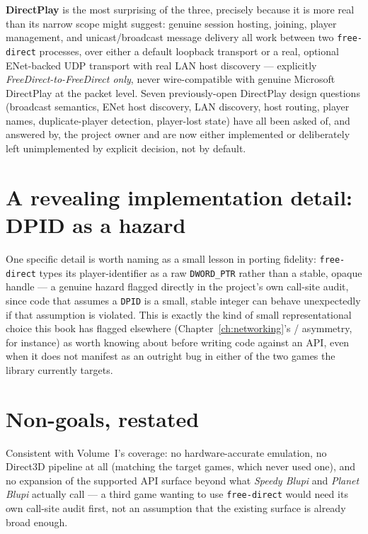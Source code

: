 \textbf{DirectPlay} is the most surprising of the three, precisely because it is more real
than its narrow scope might suggest: genuine session hosting, joining, player management, and
unicast/broadcast message delivery all work between two \texttt{free-direct} processes, over
either a default loopback transport or a real, optional ENet-backed UDP transport with real
LAN host discovery --- explicitly \emph{FreeDirect-to-FreeDirect only}, never wire-compatible
with genuine Microsoft DirectPlay at the packet level. Seven previously-open DirectPlay design
questions (broadcast semantics, ENet host discovery, LAN discovery, host routing, player
names, duplicate-player detection, player-lost state) have all been asked of, and answered by,
the project owner and are now either implemented or deliberately left unimplemented by
explicit decision, not by default.

\section{A revealing implementation detail: DPID as a hazard}

One specific detail is worth naming as a small lesson in porting fidelity: \texttt{free-direct}
types its  player-identifier as a raw \texttt{DWORD\_PTR} rather than a stable,
opaque handle --- a genuine hazard flagged directly in the project's own call-site audit,
since code that assumes a \texttt{DPID} is a small, stable integer can behave unexpectedly if
that assumption is violated. This is exactly the kind of small representational choice this
book has flagged elsewhere (Chapter~\ref{ch:networking}'s /%
  asymmetry, for instance) as worth knowing about
before writing code against an API, even when it does not manifest as an outright bug in
either of the two games the library currently targets.

\section{Non-goals, restated}

Consistent with Volume~I's coverage: no hardware-accurate emulation, no Direct3D pipeline at
all (matching the target games, which never used one), and no expansion of the supported API
surface beyond what \emph{Speedy Blupi} and \emph{Planet Blupi} actually call --- a third
game wanting to use \texttt{free-direct} would need its own call-site audit first, not an
assumption that the existing surface is already broad enough.
